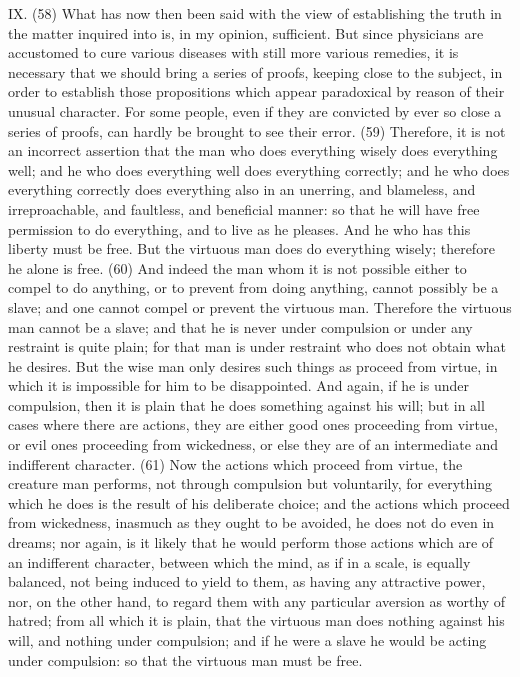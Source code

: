IX. (58) What has now then been said with the view of establishing the truth in the matter inquired
into is, in my opinion, sufficient. But since physicians are accustomed to cure various diseases
with still more various remedies, it is necessary that we should bring a series of proofs, keeping
close to the subject, in order to establish those propositions which appear paradoxical by reason
of their unusual character. For some people, even if they are convicted by ever so close a series
of proofs, can hardly be brought to see their error. (59) Therefore, it is not an incorrect assertion
that the man who does everything wisely does everything well; and he who does everything well
does everything correctly; and he who does everything correctly does everything also in an
unerring, and blameless, and irreproachable, and faultless, and beneficial manner: so that he will
have free permission to do everything, and to live as he pleases. And he who has this liberty must
be free. But the virtuous man does do everything wisely; therefore he alone is free. (60) And
indeed the man whom it is not possible either to compel to do anything, or to prevent from doing
anything, cannot possibly be a slave; and one cannot compel or prevent the virtuous man.
Therefore the virtuous man cannot be a slave; and that he is never under compulsion or under any
restraint is quite plain; for that man is under restraint who does not obtain what he desires. But the
wise man only desires such things as proceed from virtue, in which it is impossible for him to be
disappointed. And again, if he is under compulsion, then it is plain that he does something against
his will; but in all cases where there are actions, they are either good ones proceeding from virtue,
or evil ones proceeding from wickedness, or else they are of an intermediate and indifferent
character. (61) Now the actions which proceed from virtue, the creature man performs, not
through compulsion but voluntarily, for everything which he does is the result of his deliberate
choice; and the actions which proceed from wickedness, inasmuch as they ought to be avoided, he
does not do even in dreams; nor again, is it likely that he would perform those actions which are of
an indifferent character, between which the mind, as if in a scale, is equally balanced, not being
induced to yield to them, as having any attractive power, nor, on the other hand, to regard them with
any particular aversion as worthy of hatred; from all which it is plain, that the virtuous man does
nothing against his will, and nothing under compulsion; and if he were a slave he would be acting
under compulsion: so that the virtuous man must be free.

